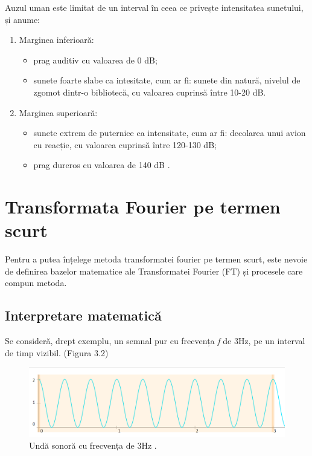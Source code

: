 \documentclass[a4paper,12pt]{report}
\begin{document}
Auzul uman este limitat de un interval în ceea ce privește intensitatea sunetului, 
și anume:
\begin{enumerate} 
    \item Marginea inferioară:
    \begin{itemize} 
        \setlength\itemsep{0.2em}
        \item prag auditiv cu valoarea de 0 dB;
        \item sunete foarte slabe ca intesitate, cum ar fi: sunete din natură, nivelul de zgomot 
        dintr-o bibliotecă, cu valoarea cuprinsă între 10-20 dB.
    \end{itemize}
    \item Marginea superioară:
    \begin{itemize} 
        \setlength\itemsep{0.2em}
        \item sunete extrem de puternice ca intensitate, cum ar fi: decolarea unui avion cu reacție, 
        cu valoarea cuprinsă între 120-130 dB;
        \item prag dureros cu valoarea de 140 dB \cite{Ed-muz-sinteze-corelari-interdisc}.
    \end{itemize}
\end{enumerate}
\section{Transformata Fourier pe termen scurt}
Pentru a putea înțelege metoda transformatei fourier pe termen scurt, 
este nevoie de definirea bazelor matematice ale Transformatei Fourier (FT) și procesele care compun 
metoda.

\subsection{Interpretare matematică}
Se consideră, drept exemplu, un semnal pur cu frecvența \emph{f} de 3Hz, 
pe un interval de timp vizibil. (Figura 3.2)

\begin{figure}[h!]
    \centering
    \includegraphics[width=12cm]{..//resources//images//semnal_3hz.png}
    \caption{Undă sonoră cu frecvența de 3Hz \cite{WEBSITE:fourier-visualization}.}
    \label{fig:bits}
\end{figure}
\end{document}
